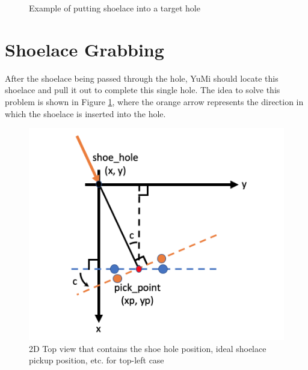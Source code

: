 \begin{figure}[H]
\centering
{}
\caption{Example of putting shoelace into a target hole}
\end{figure}

\section{Shoelace Grabbing}
After the shoelace being passed through the hole, YuMi should locate this shoelace and pull it out to complete this single hole. The idea to solve this problem is shown in Figure \ref{lacegrab}, where the orange arrow represents the direction in which the shoelace is inserted into the hole. 

\begin{figure}[H]
\centering
\includegraphics[width = 0.5\columnwidth]{Implementation/mp/lacegrab.png}
\caption{2D Top view that contains the shoe hole position, ideal shoelace pickup position, etc. for top-left case}
\label{lacegrab}
\end{figure}

